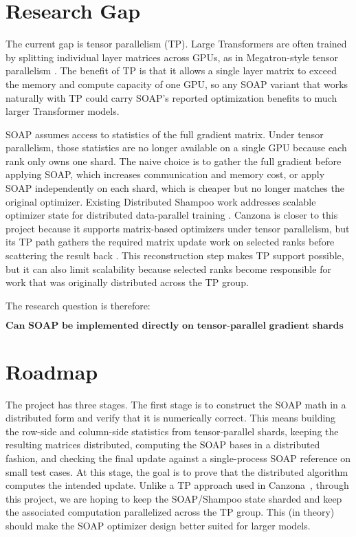 \documentclass[10pt]{article}
\begin{document}
\section{Research Gap}

The current gap is tensor parallelism (TP). Large Transformers are often trained by splitting individual layer matrices across GPUs, as in Megatron-style tensor parallelism \cite{shoeybi2019megatron,narayanan2021efficient}. The benefit of TP is that it allows a single layer matrix to exceed the memory and compute capacity of one GPU, so any SOAP variant that works naturally with TP could carry SOAP's reported optimization benefits to much larger Transformer models.


SOAP assumes access to statistics of the full gradient matrix. Under tensor parallelism, those statistics are no longer available on a single GPU because each rank only owns one shard. The naive choice is to gather the full gradient before applying SOAP, which increases communication and memory cost, or apply SOAP independently on each shard, which is cheaper but no longer matches the original optimizer. Existing Distributed Shampoo work addresses scalable optimizer state for distributed data-parallel training \cite{shi2023distributed}. Canzona is closer to this project because it supports matrix-based optimizers under tensor parallelism, but its TP path gathers the required matrix update work on selected ranks before scattering the result back \cite{wang2026canzona}. This reconstruction step makes TP support possible, but it can also limit scalability because selected ranks become responsible for work that was originally distributed across the TP group.


The research question is therefore:

$$
\textbf{Can SOAP be implemented directly on tensor-parallel gradient shards without gathering the full matrix?}
$$

\section{Roadmap}


The project has three stages. The first stage is to construct the SOAP math in a distributed form and verify that it is numerically correct. This means building the row-side and column-side statistics from tensor-parallel shards, keeping the resulting matrices distributed, computing the SOAP bases in a distributed fashion, and checking the final update against a single-process SOAP reference on small test cases. At this stage, the goal is to prove that the distributed algorithm computes the intended update. Unlike a TP approach used in Canzona~\cite{wang2026canzona}, through this project, we are hoping to keep the SOAP/Shampoo state sharded and keep the associated computation parallelized across the TP group. This (in theory) should make the SOAP optimizer design better suited for larger models.
\end{document}
